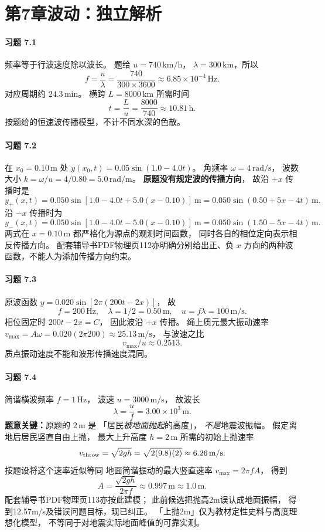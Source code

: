 \section*{第7章\quad 波动：独立解析}

\paragraph{习题 7.1}
频率等于行波速度除以波长。
题给
\(u=740\,\mathrm{km/h}\)，
\(\lambda=300\,\mathrm{km}\)，所以
\[
 \boxed{f=\frac u\lambda
 =\frac{740}{300\times3600}
 \approx6.85\times10^{-4}\,\mathrm{Hz}}.
\]
对应周期约 \(24.3\,\mathrm{min}\)。
横跨 \(L=8000\,\mathrm{km}\)
所需时间
\[
 \boxed{t=\frac Lu=\frac{8000}{740}
 \approx10.81\,\mathrm h}.
\]
按题给的恒速波传播模型，不计不同水深的色散。

\paragraph{习题 7.2}
在 \(x_0=0.10\,\mathrm m\) 处
\(y(x_0,t)=0.05\sin(1.0-4.0t)\)。
角频率 \(\omega=4\,\mathrm{rad/s}\)，
波数大小 \(k=\omega/u=4/0.80=5.0\,\mathrm{rad/m}\)。
\textbf{原题没有规定波的传播方向}，
故沿 \(+x\) 传播时是
\[
 \boxed{y_+(x,t)=0.050\sin[
 1.0-4.0t+5.0(x-0.10)]\ \mathrm m
 =0.050\sin(0.50+5x-4t)\,\mathrm m}.
\]
沿 \(-x\) 传播时为
\[
 \boxed{y_-(x,t)=0.050\sin[
 1.0-4.0t-5.0(x-0.10)]\ \mathrm m
 =0.050\sin(1.50-5x-4t)\,\mathrm m}.
\]
两式在 \(x=0.10\,\mathrm m\)
都严格化为源点的观测时间函数，
同时各自的相位定向表示相反传播方向。
配套辅导书PDF物理页112亦明确分别给出正、负
\(x\) 方向的两种波函数，不能人为添加传播方向约束。

\paragraph{习题 7.3}
原波函数
\(y=0.020\sin[2\pi(200t-2x)]\)，
故
\[
 \boxed{f=200\,\mathrm{Hz},\quad
 \lambda=1/2=0.50\,\mathrm m,\quad
 u=f\lambda=100\,\mathrm{m/s}}.
\]
相位固定时 \(200t-2x=C\)，
因此波沿 \(+x\) 传播。
绳上质元最大振动速率
\(v_{\max}=A\omega
 =0.020(2\pi 200)\approx25.13\,\mathrm{m/s}\)，
与波速之比
\[
 \boxed{v_{\max}/u\approx0.2513}.
\]
质点振动速度不能和波形传播速度混同。

\paragraph{习题 7.4}
简谐横波频率
\(f=1\,\mathrm{Hz}\)，
波速 \(u=3000\,\mathrm{m/s}\)，
故波长
\[
 \boxed{\lambda=\frac uf=3.00\times10^3\,\mathrm m}.
\]
\textbf{题意关键：}原题的 \(2\,\mathrm m\) 是
「居民\emph{被地面抛起}的高度」，
\emph{不是}地震波振幅。
假定离地后居民竖直自由上抛，
最大上升高度 \(h=2\,\mathrm m\)
所需的初始上抛速率
\[
 v_{\rm throw}=\sqrt{2gh}
 =\sqrt{2(9.8)(2)}
 \approx6.26\,\mathrm{m/s}.
\]
按题设将这个速率近似等同
地面简谐振动的最大竖直速率
\(v_{\max}=2\pi fA\)，
得到
\[
 \boxed{A=\frac{\sqrt{2gh}}{2\pi f}
 \approx0.997\,\mathrm m\approx1.0\,\mathrm m}.
\]
配套辅导书PDF物理页113亦按此建模；
此前候选把抛高2m误认成地面振幅，
得到12.57m/s及错误问题目标，现已纠正。
「上抛2m」仅为教材定性史料与高度理想化模型，
不等同于对地震实际地面峰值的可靠实测。

